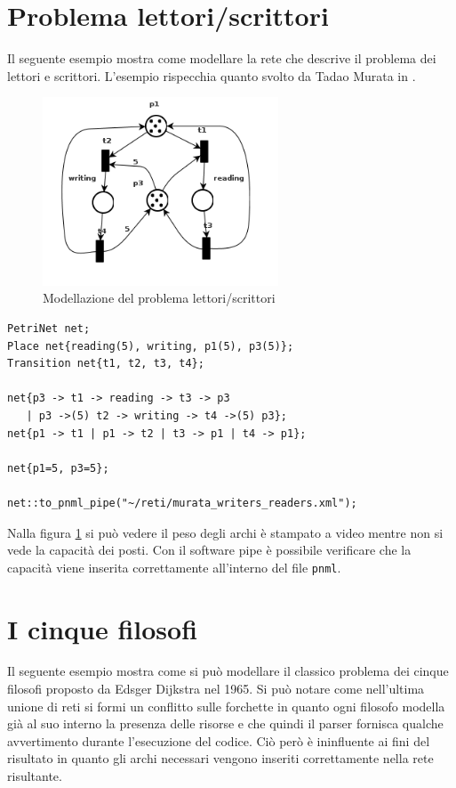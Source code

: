 \documentclass[italian,12pt]{book}
\begin{document}
\section{Problema lettori/scrittori}
Il seguente esempio mostra come modellare la rete che descrive il problema dei lettori e scrittori. L'esempio rispecchia quanto svolto da Tadao Murata in \cite{MURATA}.

\begin{figure}[htb]
\centerline{\includegraphics[width=7cm]{img/murata_writers_readers.png}}
\caption{Modellazione del problema lettori/scrittori}\label{fig:let_scrit.png}
\end{figure}

\begin{verbatim}PetriNet net;
Place net{reading(5), writing, p1(5), p3(5)};
Transition net{t1, t2, t3, t4};

net{p3 -> t1 -> reading -> t3 -> p3 
   | p3 ->(5) t2 -> writing -> t4 ->(5) p3};
net{p1 -> t1 | p1 -> t2 | t3 -> p1 | t4 -> p1};

net{p1=5, p3=5};

net::to_pnml_pipe("~/reti/murata_writers_readers.xml");
\end{verbatim}

Nalla figura \ref{fig:let_scrit.png} si può vedere il peso degli archi è stampato a video mentre non si vede la capacità dei posti. Con il software pipe è possibile verificare che la capacità viene inserita correttamente all'interno del file {\tt pnml}.

\section{I cinque filosofi}
Il seguente esempio mostra come si può modellare il classico problema
dei cinque filosofi proposto da Edsger Dijkstra nel 1965. Si può
notare come nell'ultima unione di reti si formi un conflitto sulle
forchette in quanto ogni filosofo modella già al suo interno la
presenza delle risorse e che quindi il parser fornisca qualche
avvertimento durante l'esecuzione del codice. Ciò però è ininfluente
ai fini del risultato in quanto gli archi necessari vengono inseriti
correttamente nella rete risultante.
\end{document}
